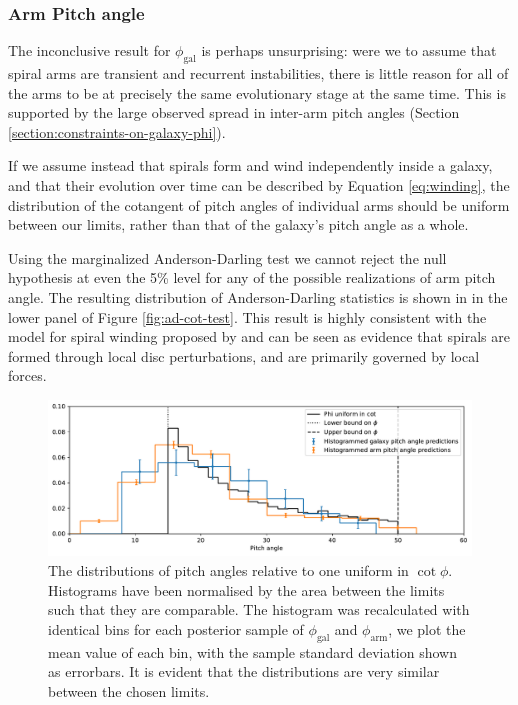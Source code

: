\subsubsection{Arm Pitch angle}
The inconclusive result for $\phi_\mathrm{gal}$ is perhaps unsurprising: were we to assume that spiral arms are transient and recurrent instabilities, there is little reason for all of the arms to be at precisely the same evolutionary stage at the same time. This is supported by the large observed spread in inter-arm pitch angles (Section \ref{section:constraints-on-galaxy-phi}).

If we assume instead that spirals form and wind independently inside a galaxy, and that their evolution over time can be described by Equation \ref{eq:winding}, the distribution of the cotangent of pitch angles of individual arms should be uniform between our limits, rather than that of the galaxy's pitch angle as a whole.

Using the marginalized Anderson-Darling test we cannot reject the null hypothesis at even the 5\% level for any of the possible realizations of arm pitch angle. The resulting distribution of Anderson-Darling statistics is shown in in the lower panel of Figure \ref{fig:ad-cot-test}. This result is highly consistent with the model for spiral winding proposed by \citet{2019arXiv190910291P} and can be seen as evidence that spirals are formed through local disc perturbations, and are primarily governed by local forces.

\begin{figure}
  \includegraphics[width=17.7cm]{plots/phi_distribution_comparison.pdf}
  \caption{The distributions of pitch angles relative to one uniform in $\cot\phi$. Histograms have been normalised by the area between the limits such that they are comparable. The histogram was recalculated with identical bins for each posterior sample of $\phi_\mathrm{gal}$ and $\phi_\mathrm{arm}$, we plot the mean value of each bin, with the sample standard deviation shown as errorbars. It is evident that the distributions are very similar between the chosen limits.}
  \label{fig:pa-cot-distributions}
\end{figure}


